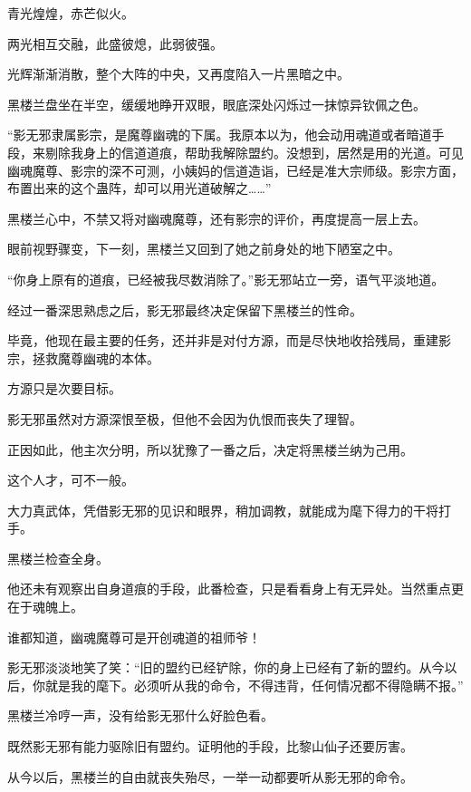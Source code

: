 
\begin{this_body}



青光煌煌，赤芒似火。

两光相互交融，此盛彼熄，此弱彼强。

光辉渐渐消散，整个大阵的中央，又再度陷入一片黑暗之中。

黑楼兰盘坐在半空，缓缓地睁开双眼，眼底深处闪烁过一抹惊异钦佩之色。

“影无邪隶属影宗，是魔尊幽魂的下属。我原本以为，他会动用魂道或者暗道手段，来剔除我身上的信道道痕，帮助我解除盟约。没想到，居然是用的光道。可见幽魂魔尊、影宗的深不可测，小姨妈的信道造诣，已经是准大宗师级。影宗方面，布置出来的这个蛊阵，却可以用光道破解之……”

黑楼兰心中，不禁又将对幽魂魔尊，还有影宗的评价，再度提高一层上去。

眼前视野骤变，下一刻，黑楼兰又回到了她之前身处的地下陋室之中。

“你身上原有的道痕，已经被我尽数消除了。”影无邪站立一旁，语气平淡地道。

经过一番深思熟虑之后，影无邪最终决定保留下黑楼兰的性命。

毕竟，他现在最主要的任务，还并非是对付方源，而是尽快地收拾残局，重建影宗，拯救魔尊幽魂的本体。

方源只是次要目标。

影无邪虽然对方源深恨至极，但他不会因为仇恨而丧失了理智。

正因如此，他主次分明，所以犹豫了一番之后，决定将黑楼兰纳为己用。

这个人才，可不一般。

大力真武体，凭借影无邪的见识和眼界，稍加调教，就能成为麾下得力的干将打手。

黑楼兰检查全身。

他还未有观察出自身道痕的手段，此番检查，只是看看身上有无异处。当然重点更在于魂魄上。

谁都知道，幽魂魔尊可是开创魂道的祖师爷！

影无邪淡淡地笑了笑：“旧的盟约已经铲除，你的身上已经有了新的盟约。从今以后，你就是我的麾下。必须听从我的命令，不得违背，任何情况都不得隐瞒不报。”

黑楼兰冷哼一声，没有给影无邪什么好脸色看。

既然影无邪有能力驱除旧有盟约。证明他的手段，比黎山仙子还要厉害。

从今以后，黑楼兰的自由就丧失殆尽，一举一动都要听从影无邪的命令。


\end{this_body}
